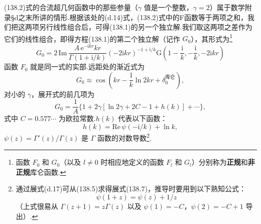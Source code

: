 (138.2)式的合流超几何函数中的那些参量（$\gamma$ 值是一个整数，$\gamma=2$）属于数学附录§d之末所讲的情形.根据该处的(d.14)式，(138.2)式中的F函数等于两项之和，我们把这两项另行线性组合后，可得(138.1)的另一个独立解.我们取这两项之差作为它们的线性组合，即得方程(138.1)的第二个独立解（记作 $G_0$），其形式为\footnote{函数 $F_0$ 和 $G_0$（以及 $l\neq0$ 时相应地定义的函数 $F_l$ 和 $G_l$）分别称为\textbf{正规}和\textbf{非正规}库仑函数.}
\begin{equation}
  G_0=2\,\mathrm{Im}\,
  \frac{A\,\mathrm{e}^{-\mathrm{i}kr}kr}{\Gamma(1+\mathrm{i}/k)}
  \left(-2\mathrm{i}kr\right)^{-1+\mathrm{i}/k}
  \mathrm{G}\left(1-\frac{\mathrm{i}}{k},-\frac{\mathrm{i}}{k},
  -2\mathrm{i}kr\right)
\end{equation}
函数 $F_0$ 就是同一式的实部.远距处的渐近式为
\begin{equation}
  G_0\approx\cos\left(kr-\frac{1}{k}\ln 2kr
  +\delta_0^{\text{库仑}}\right),
\end{equation}
对小的 $\gamma$，展开式的前几项为
\begin{equation}
  G_0=\frac{1}{A}\bigl\{1+2\gamma\left[\ln 2\gamma+2C-1+h(k)\right]
  +\cdots\bigr\},
\end{equation}
式中 $C=0.577\cdots$ 为欧拉常数.$h(k)$ 代表以下函数：
\begin{equation}
  h(k)=\mathrm{Re}\,\psi\left(-\mathrm{i}/k\right)+\ln k,
\end{equation}
$\psi(z)=\Gamma'(z)/\Gamma(z)$ 是 $\Gamma$ 函数的对数导数\footnote{通过展式(d.17)可从(138.5)求得展式(138.7)，推导时要用到以下熟知公式：
\begin{equation*}
  \psi(1+z)=\psi(z)+1/z
\end{equation*}
（上式很易从 $\Gamma(z+1)=z\Gamma(z)$ 以及 $\psi(1)=-C$，$\psi(2)=-C+1$ 导出）.}.

